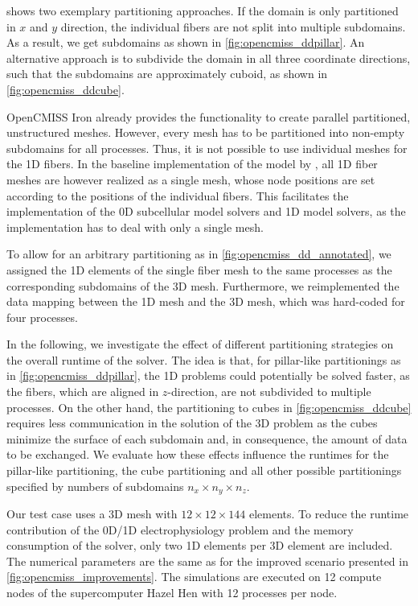 shows two exemplary partitioning approaches. If the domain is only partitioned in $x$ and $y$ direction, the individual fibers are not split into multiple subdomains. As a result, we get  subdomains as shown in \cref{fig:opencmiss_ddpillar}. An alternative approach is to subdivide the domain in all three coordinate directions, such that the subdomains are approximately cuboid, as shown in \cref{fig:opencmiss_ddcube}.

OpenCMISS Iron already provides the functionality to create parallel partitioned, unstructured meshes. However, every mesh has to be partitioned into non-empty subdomains for all processes. Thus, it is not possible to use individual meshes for the 1D fibers.
In the baseline implementation of the model by \cite{Heidlauf2013}, all 1D fiber meshes are however realized as a single mesh, whose node positions are set according to the positions of the individual fibers. This facilitates the implementation of the 0D subcellular model solvers and 1D model solvers, as the implementation has to deal with only a single mesh. 

To allow for an arbitrary partitioning as in \cref{fig:opencmiss_dd_annotated}, we assigned the 1D elements of the single fiber mesh to the same processes as the corresponding subdomains of the 3D mesh. Furthermore, we reimplemented the data mapping between the 1D mesh and the 3D mesh, which was hard-coded for four processes.

In the following, we investigate the effect of different partitioning strategies on the overall runtime of the solver. The idea is that, for pillar-like partitionings as in \cref{fig:opencmiss_ddpillar}, the 1D problems could potentially be solved faster, as the fibers, which are aligned in $z$-direction, are not subdivided to multiple processes. On the other hand, the partitioning to cubes in \cref{fig:opencmiss_ddcube} requires less communication in the solution of the 3D problem as the cubes minimize the surface of each subdomain and, in consequence, the amount of data to be exchanged. We evaluate how these effects influence the runtimes for the pillar-like partitioning, the cube partitioning and all other possible partitionings specified by numbers of subdomains $n_x \times n_y \times n_z$.

Our test case uses a 3D mesh with $12 \times 12 \times 144$ elements. To reduce the runtime contribution of the 0D/1D electrophysiology problem and the memory consumption of the solver, only two 1D elements per 3D element are included. The numerical parameters are the same as for the improved scenario presented in \cref{fig:opencmiss_improvements}. The simulations are executed on 12 compute nodes of the supercomputer Hazel Hen with 12 processes per node.

